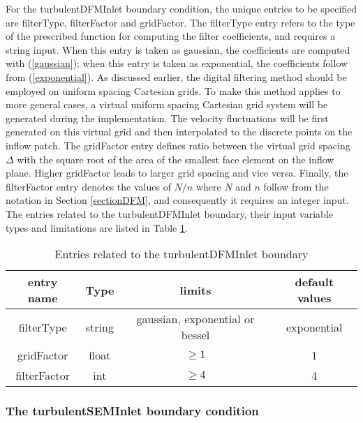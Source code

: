 For the \textcolor{mauve}{turbulentDFMInlet} boundary condition, the unique entries to be specified are \textcolor{mauve}{filterType}, \textcolor{mauve}{filterFactor} and \textcolor{mauve}{gridFactor}. The \textcolor{mauve}{filterType} entry refers to the type of the prescribed function for computing the filter coefficients, and requires a string input. When this entry is taken as \textcolor{mauve}{gaussian}, the coefficients are computed with (\ref{gaussian}); when this entry is taken as \textcolor{mauve}{exponential}, the coefficients follow from (\ref{exponential}). As discussed earlier, the digital filtering method should be employed on uniform spacing Cartesian grids. To make this method applies to more general cases, a virtual uniform spacing Cartesian grid system will be generated during the implementation. The velocity fluctuations will be first generated on this virtual grid and then interpolated to the discrete points on the inflow patch. The \textcolor{mauve}{gridFactor} entry defines ratio between the virtual grid spacing $\Delta$ with the square root of the area of the smallest face element on the inflow plane. Higher \textcolor{mauve}{gridFactor} leads to larger grid spacing and vice versa. Finally, the \textcolor{mauve}{filterFactor} entry denotes the values of $N/n$ where $N$ and $n$ follow from the notation in Section \ref{sectionDFM}, and consequently it requires an integer input. The entries related to the turbulentDFMInlet boundary, their input variable types and limitations are listed in Table \ref{entryDigital}.

\begin{table}[H]
\centering
\begin{tabular}{c|c|c|c}
\hline
entry name & Type & limits & default values \\
\hline
\textcolor{mauve}{filterType} & string & gaussian, exponential or bessel & exponential \\
\hline
\textcolor{mauve}{gridFactor} & float & $\geq 1$ & 1 \\
\hline
\textcolor{mauve}{filterFactor} & int & $\geq 4$  & 4 \\
\hline
\end{tabular} \caption{Entries related to the \textcolor{mauve}{turbulentDFMInlet} boundary}\label{entryDigital}
\end{table}

\subsubsection{The \textcolor{mauve}{turbulentSEMInlet} boundary condition}

